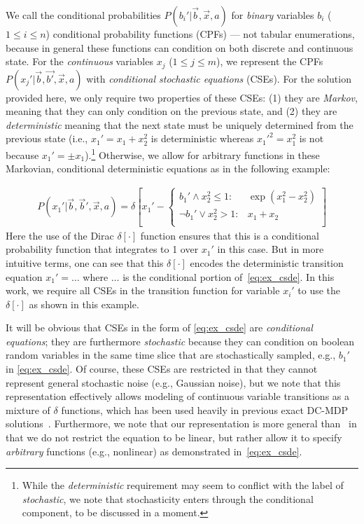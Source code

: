 \documentclass[letterpaper]{article}
\begin{document}
We call the conditional
probabilities $P(b_i'|\vec{b},\vec{x},a)$ for \emph{binary} variables
$b_i$ ($1 \leq i \leq n$) conditional
probability functions (CPFs) --- not tabular enumerations,
because in general these functions
can condition on both discrete and continuous state.
For the \emph{continuous} variables $x_j$
($1 \leq j \leq m$), we represent the CPFs 
$P(x_j'|\vec{b},\vec{b'},\vec{x},a)$ with \emph{conditional stochastic
 equations} (CSEs).  For the solution provided here, we
only require two properties of these CSEs: (1) they are
\emph{Markov}, meaning that they can only condition on the previous
state, and (2) they are \emph{deterministic} meaning that the next state must
be uniquely determined from the previous state (i.e., $x_1' = x_1 +
x_2^2$ is deterministic whereas $x_1'^2 = x_1^2$ is not because $x_1'
= \pm x_1$).\footnote{While the \emph{deterministic} 
requirement may seem to conflict 
with the label of \emph{stochastic}, we note that stochasticity enters through
the conditional component, to be discussed in a moment.}
Otherwise, we allow for arbitrary functions in these
Markovian, conditional deterministic equations as in the following
example:
\vspace{-3mm}

{\footnotesize
\begin{align}
P(x_1' | \vec{b},\vec{b}',\vec{x},a) = \delta\left[ x_1' - 
\begin{cases}
b_1' \land x_2^2 \leq 1 : & \exp(x_1^2 - x_2^2) \\
\neg b_1' \lor  x_2^2 > 1 : & x_1 + x_2 \\
\end{cases}
\right] \label{eq:ex_csde}
\end{align}}
Here %
the use of the Dirac $\delta[\cdot]$ function ensures that this is a
conditional probability function that integrates to 1 over $x_1'$
in this case.  But in more intuitive terms, one can see that this
$\delta[\cdot]$ encodes the deterministic transition 
equation $x_1' = \ldots$ where $\ldots$ is the conditional portion 
of~\eqref{eq:ex_csde}.
In this work, we require all CSEs in the transition
function for variable $x_i'$ to use the $\delta[\cdot]$ as shown in this
example.

It will be obvious that CSEs in the form of \eqref{eq:ex_csde} are
\emph{conditional  equations}; they are furthermore \emph{stochastic}
because they can condition on boolean random variables in the same time slice
that are stochastically sampled, e.g., $b_1'$ in
\eqref{eq:ex_csde}.  Of course, these CSEs are restricted in that
they cannot represent general stochastic noise (e.g., Gaussian noise),
but we note that this representation effectively allows modeling of
continuous variable transitions as a mixture of $\delta$ functions,
which has been used heavily in previous exact DC-MDP
solutions~\cite{feng04,li05,hao09}.  Furthermore, we note that our
representation is more general than~\cite{feng04,li05,hao09} in that
we do not restrict the  equation to be linear, but rather
allow it to specify \emph{arbitrary} functions (e.g., nonlinear) as
demonstrated in~\eqref{eq:ex_csde}.
\end{document}
